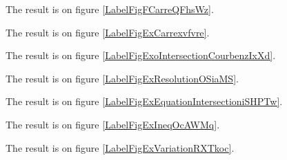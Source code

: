 \documentclass[a4paper,12pt]{article}
\begin{document}

The result is on figure \ref{LabelFigFCarreQFhsWz}.
\newcommand{\CaptionFigFCarreQFhsWz}{<+Type your caption here+>}


The result is on figure \ref{LabelFigExCarrexvfvre}.
\newcommand{\CaptionFigExCarrexvfvre}{<+Type your caption here+>}


The result is on figure \ref{LabelFigExoIntersectionCourbenzIxXd}.
\newcommand{\CaptionFigExoIntersectionCourbenzIxXd}{<+Type your caption here+>}



\clearpage


The result is on figure \ref{LabelFigExResolutionOSiaMS}.
\newcommand{\CaptionFigExResolutionOSiaMS}{<+Type your caption here+>}


The result is on figure \ref{LabelFigExEquationIntersectioniSHPTw}.
\newcommand{\CaptionFigExEquationIntersectioniSHPTw}{<+Type your caption here+>}


The result is on figure \ref{LabelFigExIneqOcAWMq}.
\newcommand{\CaptionFigExIneqOcAWMq}{<+Type your caption here+>}


\clearpage

The result is on figure \ref{LabelFigExVariationRXTkoc}.
\newcommand{\CaptionFigExVariationRXTkoc}{<+Type your caption here+>}

\end{document}
